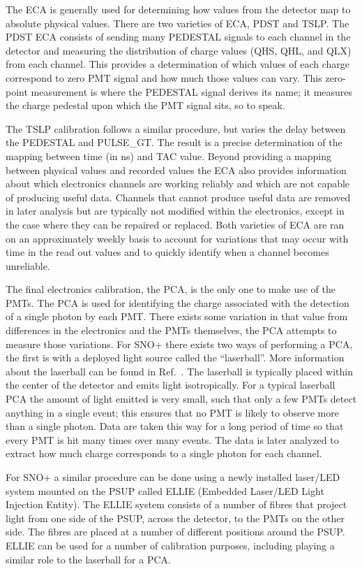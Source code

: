 The ECA is generally used for determining how values from the detector map to absolute
physical values.
There are two varieties of ECA,  PDST and  TSLP\@.
The PDST ECA consists of sending many PEDESTAL signals to each channel in the detector and
measuring the distribution of charge values (QHS, QHL, and QLX) from each channel.
This provides a determination of which values of each charge correspond to zero PMT
signal and how much those values can vary.
This zero-point measurement is where the PEDESTAL signal derives its name; it measures
the charge pedestal upon which the PMT signal sits, so to speak.

The TSLP calibration follows a similar procedure, but varies the delay between
the PEDESTAL and PULSE\_GT\@.
The result is a precise determination of the mapping between time (in ns) and
TAC value.
Beyond providing a mapping between physical values and recorded values the ECA
also provides information about which electronics channels are working reliably
and which are not capable of producing useful data.
Channels that cannot produce useful data are removed in later analysis but are
typically not modified within the electronics, except in the case where they
can be repaired or replaced.
Both varieties of ECA are ran on an approximately weekly basis to account for
variations that may occur with time in the read out values and to quickly
identify when a channel becomes unreliable.

The final electronics calibration, the PCA, is the only one to make use of the PMTs.
The PCA is used for identifying the charge associated with the detection of a single
photon by each PMT\@.
There exists some variation in that value from differences in the
electronics and the PMTs themselves, the PCA attempts to measure those variations.
For SNO+ there exists two ways of performing a PCA, the first is with a deployed light
source called the ``laserball''.
More information about the laserball can be found in Ref.~\citep{sno_laserball}.
The laserball is typically placed within the center of the
detector and emits light isotropically. For a typical laserball PCA the amount of light emitted
is very small, such that only a few PMTs detect anything in a single event;
this ensures that no PMT is likely to observe more than a single photon.
Data are taken this way for a long period of time so that every PMT is hit many times over
many events. The data is later analyzed to extract how much charge corresponds to a single
photon for each channel.

For SNO+ a similar procedure can be done using a newly installed laser/LED system
mounted on the PSUP called ELLIE (Embedded Laser/LED Light Injection Entity).
The ELLIE system consists of a number of fibres that project light from one
side of the PSUP, across the detector, to the PMTs on the other side.
The fibres are placed at a number of different positions around the PSUP\@.
ELLIE can be used for a number of calibration purposes, including playing a
similar role to the laserball for a PCA\@.

